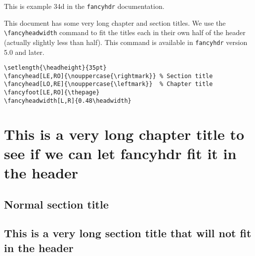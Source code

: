 \documentclass[oneside]{book}
\begin{document}
\thispagestyle{plain}
\tableofcontents

\bigskip

\noindent
\begin{boxedminipage}{\textwidth}
This is example 34d in the \texttt{fancyhdr} documentation.

This document has some very long chapter and section titles. We use the \verb|\fancyheadwidth| command to fit the titles each in their own half of the header (actually slightly less than half). This command is available in \texttt{fancyhdr} version 5.0 and later.

\begin{verbatim}
\setlength{\headheight}{35pt}
\fancyhead[LE,RO]{\nouppercase{\rightmark}} % Section title
\fancyhead[LO,RE]{\nouppercase{\leftmark}}  % Chapter title
\fancyfoot[LE,RO]{\thepage}
\fancyheadwidth[L,R]{0.48\headwidth}
\end{verbatim}
\end{boxedminipage}

\newpage
\pagestyle{fancy}
\chapter{This is a very long chapter title to see if we can
          let fancyhdr fit it in the header}
\thispagestyle{fancy}

\kant[2-4]

\section{Normal section title}

\kant[5-6]

\section{This is a very long section title that will not fit
         in the header}

\kant[7]
\end{document}
